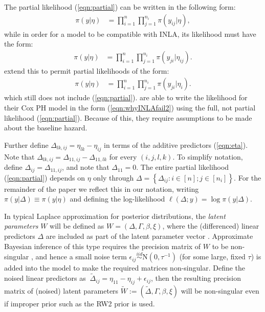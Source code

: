 \documentclass[ba]{imsart}
\begin{document}
The partial likelihood (\ref{eqn:partial}) can be written in the following form:
\begin{equation}\begin{aligned}\label{eqn:whyINLAfail1}
\pi(y|\eta) &= \prod_{i=1}^{n}\prod_{j=1}^{n_{i}} \pi(y_{ij}|\eta),
\end{aligned}\end{equation}
while in order for a model to be compatible with INLA, its likelihood must have the form:
\begin{equation}\begin{aligned}\label{eqn:whyINLAfail2}
\pi(y|\eta) &= \prod_{i=1}^{n}\prod_{j=1}^{n_{i}} \pi(y_{ji}|\eta_{ij}).
\end{aligned}\end{equation}
\cite{casecross} extend this to permit partial likelihoods of the form:
\begin{equation}\begin{aligned}\label{eqn:casecrosslik}
\pi(y|\eta) &= \prod_{i=1}^{n}\prod_{j=1}^{n_{i}} \pi(y_{ji}|\eta_{i}).
\end{aligned}\end{equation}
which still does not include (\ref{eqn:partial}). \cite{inlacoxph} are able to write the likelihood for their Cox PH model in the form (\ref{eqn:whyINLAfail2}) using the full, not partial likelihood (\ref{eqn:partial}). Because of this, they require assumptions to be made about the baseline hazard.

Further define $\Delta_{lk,ij} = \eta_{lk} - \eta_{ij}$ in terms of the additive predictors (\ref{eqn:eta}). Note that $\Delta_{lk,ij} = \Delta_{11,ij} - \Delta_{11,lk}$ for every $(i,j,l,k)$. To simplify notation, define $\Delta_{ij} = \Delta_{11,ij}$, and note that $\Delta_{11} = 0$. The entire partial likelihood (\ref{eqn:partial}) depends on $\eta$ only through  $\Delta = \left\{\Delta_{ij}: i \in [n]; j \in [n_{i}] \right\}$. For the remainder of the paper we reflect this in our notation, writing $\pi(y|\Delta) \equiv \pi(y|\eta)$ and defining the log-likelihood $\ell(\Delta; y) = \log\pi(y|\Delta)$.

In typical Laplace approximation for posterior distributions, the \textit{latent parameters} $W$ will be defined as $W = \left(\Delta, \Gamma,\beta, \xi \right)$, where the (differenced) linear predictors $\Delta$ are included as part of the latent parameter vector \citep{inla,inlacoxph,casecross}. Approximate Bayesian inference of this type requires the precision matrix of $W$ to be non-singular \citep{tierney}, and hence a small noise term $\epsilon_{ij} \stackrel{iid}{\sim} \text{N}(0,\tau^{-1})$ (for some large, fixed $\tau$) is added into the model to make the required matrices non-singular. Define the noised linear predictors as $\ \tilde{\Delta}_{ij} = \eta_{11} - \eta_{ij} + \epsilon_{ij}$, then the resulting precision matrix of (noised) latent parameters $\tilde{W} := (\tilde{\Delta}, \Gamma,\beta, \xi )$ will be non-singular even if improper prior such as the RW2 prior is used.
\end{document}

